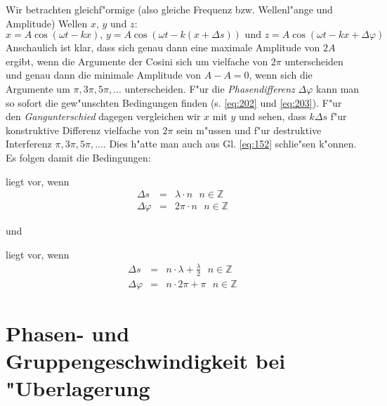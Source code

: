 Wir betrachten gleichf"ormige (also gleiche Frequenz
bzw. Wellenl"ange und Amplitude) Wellen $x$, $y$ und $z$:
\begin{equation*}
   x = A \cos(\omega t - kx) \text{, } y = A \cos(\omega t  - k
   (x+\Delta s))
\text{ und } z = A \cos(\omega t - kx + \Delta \varphi)
\end{equation*}
Anschaulich ist klar, dass sich genau dann eine maximale Amplitude von
$2A$ ergibt, wenn die Argumente der Cosini sich um vielfache von
$2\pi$ unterscheiden und genau dann die minimale Amplitude von $A-A =
0$, wenn sich die Argumente um $\pi, 3\pi, 5\pi,...$
unterscheiden. F"ur die \emph{Phasendifferenz} $\Delta \varphi$ kann man so
sofort die gew"unschten Bedingungen finden (s. \eqref{eq:202} und
\eqref{eq:203}). F"ur den \emph{Gangunterschied} dagegen vergleichen
wir $x$ mit $y$ und sehen, dass $k \Delta s$ f"ur konstruktive
Differenz vielfache von $2\pi$ sein m"ussen und f"ur destruktive
Interferenz $\pi, 3\pi, 5\pi,...$. Dies h"atte man auch aus
Gl. \eqref{eq:152} schlie"sen k"onnen. Es folgen damit die Bedingungen:

\begin{Wichtig}
    liegt vor, wenn
\begin{eqnarray}
   \label{eq:155}
   \Delta s &=& \lambda \cdot n ~ ~ ~ n \in \mathbb Z\\
\label{eq:202}
   \Delta\varphi &=& 2\pi \cdot n~ ~ ~ n \in \mathbb Z
\end{eqnarray}
\end{Wichtig}

und

\begin{Wichtig}
    liegt vor, wenn
\begin{eqnarray}
\label{eq:157}
   \Delta s &=& n \cdot \lambda + \frac{\lambda }{2} ~ ~ ~ n \in
   \mathbb Z\\
\label{eq:203}
   \Delta\varphi &=& n \cdot 2\pi  + \pi~ ~ ~ n \in \mathbb Z
\end{eqnarray}
\end{Wichtig}




\section{Phasen- und Gruppengeschwindigkeit bei "Uberlagerung}
\label{kap_phasen-und-gruppengeschwindigkeit-bei-uberlagerung}

